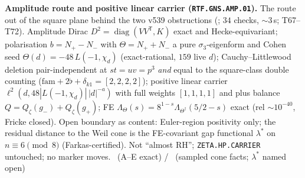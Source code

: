 \documentclass[11pt,a4paper]{article}
\theoremstyle{definition}
\begin{document}
\par\smallskip\noindent\textbf{Amplitude route and positive linear carrier
(\texttt{RTF.GNS.AMP.01}).}
The route out of the square plane behind the two v539 obstructions
(; $34$ checks, $\sim3$\,s; T67--T72).
Amplitude Dirac $D^2=\operatorname{diag}(VV^{\mathsf T},K)$ exact and
Hecke-equivariant; polarisation $b=N_+-N_-$ with $\Theta=N_++N_-$ a pure
$\sigma_3$-eigenform and Cohen seed $\Theta(d)=-48\,L(-1,\chi_d)$ (exact-rational,
$159$ live $d$); Cauchy--Littlewood deletion pair-independent at $st=uv=p^3$
\emph{and} equal to the square-class double counting
($\mathrm{fam}+2\flat+\delta_{k1}=[2,2,2,2]$); positive linear carrier
$\ell^2(d,48|L(-1,\chi_d)|\,|d|^{-a})$ with full weights $[1,1,1,1]$ and plus
balance $Q=Q_\zeta(g_-)+Q_\zeta(g_+)$; FE
$\Lambda_\Theta(s)=8^{1-s}\Lambda_{\Theta^\dagger}(5/2-s)$ exact
(rel $\sim10^{-40}$, Fricke closed).
Open boundary as content: Euler-region positivity only; the residual distance to
the Weil cone is the FE-covariant gap functional $\lambda^*$ on $n\equiv6\pmod 8$
(Farkas-certified). Not ``almost RH''; \texttt{ZETA.HP.CARRIER} untouched;
no marker moves.
\mE\ (A--E exact) / \mC\ (sampled cone facts; $\lambda^*$ named open)
\end{document}
